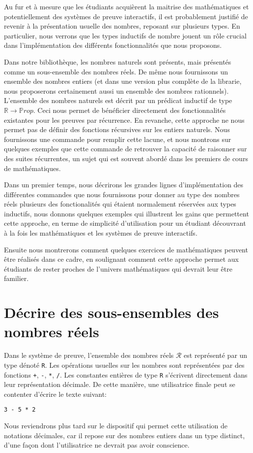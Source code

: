 \documentclass[draft]{jflart}
\begin{document}
Au fur et à mesure que les étudiants acquièrent la maitrise des
mathématiques et potentiellement des systèmes de preuve interactifs,
il est probablement justifié de revenir à la présentation usuelle des
nombres, reposant sur plusieurs types.  En particulier, nous verrons
que les types inductifs de nombre jouent un rôle crucial dans
l'implémentation des différents fonctionnalités que nous proposons.

Dans notre bibliothèque, les nombres naturels sont présents, mais
présentés comme un sous-ensemble des nombres réels.  De même nous
fournissons un ensemble des nombres entiers (et dans une version plus
complète de la librarie, nous proposerons certainement aussi un
ensemble des nombres rationnels).  L'ensemble des nombres naturels est
décrit par un prédicat inductif de type \({\mathbb R} \rightarrow
{\mathbb Prop}\).  Ceci nous permet de bénéficier directement des
fonctionnalités existantes pour les preuves par récurrence.  En
revanche, cette approche ne nous permet pas de définir des fonctions
récursives sur les entiers naturels.  Nous fournissons une commande
pour remplir cette lacune, et nous montrons sur quelques exemples que
cette commande de retrouver la capacité de raisonner sur des suites
récurrentes, un sujet qui est souvent abordé dans les premiers de
cours de mathématiques.

Dans un premier temps, nous décrirons les grandes lignes d'implémentation des
différentes commandes que nous fournissons pour donner au type des
nombres réels plusieurs des fonctionalités qui étaient normalement
réservées aux types inductifs, nous donnons quelques exemples qui
illustrent les gains que permettent cette approche, en terme de
simplicité d'utilisation pour un étudiant découvrant à la fois les
mathématiques et les systèmes de preuve interactifs.

Ensuite nous montrerons comment quelques exercices de mathématiques
peuvent être réalisés dans ce cadre, en soulignant comment cette
approche permet aux étudiants de rester proches de l'univers
mathématiques qui devrait leur être familier.
\section{Décrire des sous-ensembles des nombres réels}
Dans le système de preuve, l'ensemble des nombres réels \(\mathcal R\)
est représenté par un type dénoté \texttt{R}.  Les opérations usuelles
sur les nombres sont représentées par des fonctions \texttt{+}, \texttt{-},
\texttt{*}, \texttt{/}.  Les constantes entières de type \texttt{R} s'écrivent
directement dans leur représentation décimale.  De cette manière, une
utilisatrice finale peut se contenter d'écrire le texte suivant:
\begin{verbatim}
3 - 5 * 2
\end{verbatim}
Nous reviendrons plus tard sur le dispositif qui permet cette
utilisation de notations décimales, car il repose sur des nombres
entiers dans un type distinct, d'une façon dont l'utilisatrice ne
devrait pas avoir conscience.
\end{document}
